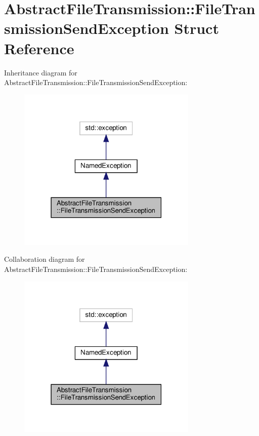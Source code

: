 \hypertarget{structAbstractFileTransmission_1_1FileTransmissionSendException}{}\section{Abstract\+File\+Transmission\+:\+:File\+Transmission\+Send\+Exception Struct Reference}
\label{structAbstractFileTransmission_1_1FileTransmissionSendException}


Inheritance diagram for Abstract\+File\+Transmission\+:\+:File\+Transmission\+Send\+Exception\+:\nopagebreak
\begin{figure}[H]
\begin{center}
\leavevmode
\includegraphics[width=243pt]{d6/d87/structAbstractFileTransmission_1_1FileTransmissionSendException__inherit__graph}
\end{center}
\end{figure}


Collaboration diagram for Abstract\+File\+Transmission\+:\+:File\+Transmission\+Send\+Exception\+:\nopagebreak
\begin{figure}[H]
\begin{center}
\leavevmode
\includegraphics[width=243pt]{dd/d64/structAbstractFileTransmission_1_1FileTransmissionSendException__coll__graph}
\end{center}
\end{figure}
